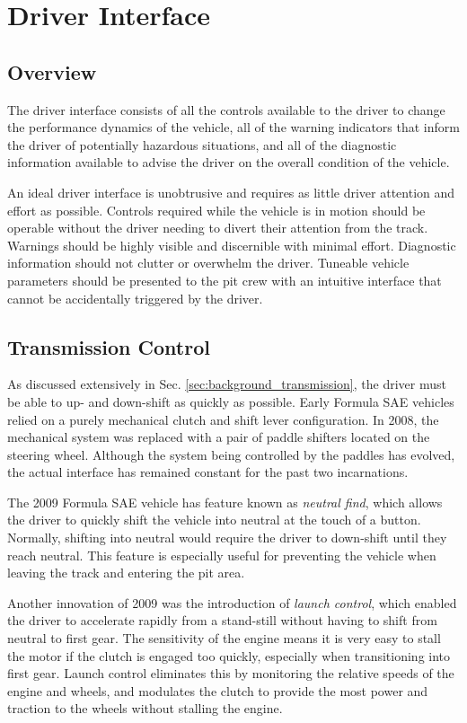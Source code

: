 \section{Driver Interface}

\subsection{Overview}

The driver interface consists of all the controls available to the driver to change the performance dynamics of the vehicle, all of the warning indicators that inform the driver of potentially hazardous situations, and all of the diagnostic information available to advise the driver on the overall condition of the vehicle.

An ideal driver interface is unobtrusive and requires as little driver attention and effort as possible. Controls required while the vehicle is in motion should be operable without the driver needing to divert their attention from the track. Warnings should be highly visible and discernible with minimal effort. Diagnostic information should not clutter or overwhelm the driver. Tuneable vehicle parameters should be presented to the pit crew with an intuitive interface that cannot be accidentally triggered by the driver.

\subsection{Transmission Control}

As discussed extensively in Sec. \ref{sec:background_transmission}, the driver must be able to up- and down-shift as quickly as possible. Early Formula SAE vehicles relied on a purely mechanical clutch and shift lever configuration. In 2008, the mechanical system was replaced with a pair of paddle shifters located on the steering wheel. Although the system being controlled by the paddles has evolved, the actual interface has remained constant for the past two incarnations.

The 2009 Formula SAE vehicle has feature known as \emph{neutral find}, which allows the driver to quickly shift the vehicle into neutral at the touch of a button. Normally, shifting into neutral would require the driver to down-shift until they reach neutral. This feature is especially useful for preventing the vehicle when leaving the track and entering the pit area. 

Another innovation of 2009 was the introduction of \emph{launch control}, which enabled the driver to accelerate rapidly from a stand-still without having to shift from neutral to first gear. The sensitivity of the engine means it is very easy to stall the motor if the clutch is engaged too quickly, especially when transitioning into first gear. Launch control eliminates this by monitoring the relative speeds of the engine and wheels, and modulates the clutch to provide the most power and traction to the wheels without stalling the engine. 
 

